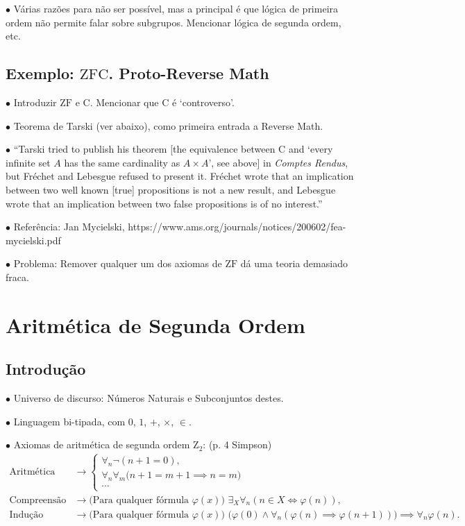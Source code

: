 \documentclass{article}
\theoremstyle{nonumberplain}
\newcommand{\ZZ}{\mathrm{Z}}
\newcommand{\ZFC}{\mathrm{ZFC}}
\newcommand{\ZF}{\mathrm{ZF}}
\newcommand{\Choice}{\mathrm{C}}
\newcommand\point[1]{\noindent \hspace{\labelsep} $\bullet$ #1 \smallskip}
\newcommand\timestamp[1]{}
\begin{document}
\point{Várias razões para não ser possível, mas a principal é que lógica de primeira ordem não permite falar sobre subgrupos. Mencionar lógica de segunda ordem, etc.}

\subsection{Exemplo: $\ZFC$. Proto-Reverse Math}

\point{Introduzir $\ZF$ e $\Choice$. Mencionar que $\Choice$ é `controverso'.}

\point{Teorema de Tarski (ver abaixo), como primeira entrada a Reverse Math.}

\point{``Tarski tried to publish his theorem [the equivalence between $\Choice$ and `every infinite set $A$ has the same cardinality as $A \times A$', see above] in \textit{Comptes Rendus}, but Fréchet and Lebesgue refused to present it. Fréchet wrote that an implication between two well known [true] propositions is not a new result, and Lebesgue wrote that an implication between two false propositions is of no interest.''}

\point{Referência: Jan Mycielski, https://www.ams.org/journals/notices/200602/fea-mycielski.pdf}

\point{Problema: Remover qualquer um dos axiomas de $\ZF$ dá uma teoria demasiado fraca.}

\timestamp{18 min}

\section{Aritmética de Segunda Ordem}

\subsection{Introdução}

\point{Universo de discurso: Números Naturais e Subconjuntos destes.}

\point{Linguagem bi-tipada, com $0$, $1$, $+$, $\times$, $\in$.}

\point{Axiomas de aritmética de segunda ordem $\ZZ_2$: (p. 4 Simpson)}
\begin{equation}
\begin{aligned}
\text{Aritmética Básica} &\rightarrow \begin{cases}
\forall_n \neg (n+1 = 0),\\
\forall_n \forall_m \big( n+1 = m+1 \implies n=m \big)\\
\cdots
\end{cases}\\
\text{Compreensão} &\rightarrow \text{(Para qualquer fórmula $\varphi(x)$) } \exists_X \forall_n (n \in X \iff \varphi(n)),\\
\text{Indução} &\rightarrow \text{(Para qualquer fórmula $\varphi(x)$) } \big(\varphi(0) \land \forall_n (\varphi(n) \implies \varphi(n+1)) \big) \implies \forall_n \varphi(n).
\end{aligned}
\end{equation}
\end{document}
